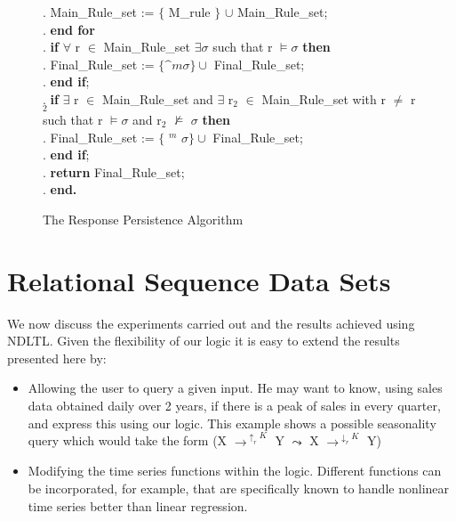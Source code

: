 {\begin{figure}[ht]
\begin{center}
{\begin{minipage}{16cm}
\begin{algorithm}
\begin{rm}
\begin{tabbing}
\sa.  \> \> \> \> Main\_Rule\_set :=  $\{$ M\_rule $\}$ $\cup$ Main\_Rule\_set; \\
\sa.  \> \> \> {\bf end for}\\
\sa.  \> \> \> {\bf if } $\forall$ r $\in$ Main\_Rule\_set $\exists \sigma$
such that r $\models \sigma$ {\bf then} \\
\sa.  \> \> \> \> Final\_Rule\_set := $\{ \bm^m \sigma  \} \cup$ Final\_Rule\_set; \\
\sa.  \> \> \> {\bf end if};\\
\sa.  \> \> \> {\bf if } $\exists$ r $\in$ Main\_Rule\_set and $\exists$ r$_2$
$\in$ Main\_Rule\_set with r $\not=$ r$_2$ \\ 
\> \> \> \> \> such that r $\models \sigma$ and r$_2$
 $\not\models$ $\sigma$ {\bf then} \\
\sa.  \> \> \> \> Final\_Rule\_set := $\{$ \diam$^m$ $\sigma \} \cup$ Final\_Rule\_set;\\
\sa.  \> \> \> {\bf end if};\\

\sa.  \> \> \> {\bf return} Final\_Rule\_set; \\
\sa. \> \> {\bf end.}
\end{tabbing}
\end{rm}
\end{algorithm}
\end{minipage}}
\caption{\label{tr:fig:resp} The Response Persistence Algorithm}
\end{center}
\end{figure}
}




\section{Relational Sequence Data Sets}\label{sec:tr_relseq}


We now discuss the experiments carried out and the results achieved
using NDLTL. Given the flexibility of our logic it is easy to extend
the results presented here by: 
\begin{itemize}
\item Allowing the user to query a given input. He may want to know,
using sales data obtained daily over 2 years, if there is a peak of sales in every quarter, and
express this using our logic. This example shows a possible
seasonality query which would take the form  (X
$\to^{\uparrow_r K}$ Y $\leadsto$ X
$\to^{\downarrow_r K}$ Y)
\item Modifying the time series functions within the logic. Different
functions can be incorporated, for example, that are specifically
known to handle nonlinear time series better than linear regression.
\end{itemize}

